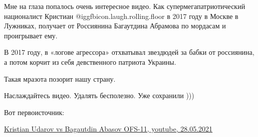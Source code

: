 Мне на глаза попалось очень интересное видео. Как супермегапатриотический
националист Кристиан  @igg{fbicon.laugh.rolling.floor}  в 2017 году в Москве в
Лужниках, получает от Россиянина Багаутдина Абрамова по мордасам и проигрывает
ему.

В 2017 году, в «логове агрессора» отхватывал звездюдей за бабки от россиянина,
а потом корчит из себя девственного патриота Украины. 

Такая мразота позорит нашу страну. 

Наслаждайтесь видео. Удалять бесполезно. Уже сохранили )))

Вот первоисточник: 

\href{https://youtu.be/o2B1e1eZoH0}{%
Kristian Udarov vs Bagautdin Abasov OFS-11, youtube, 28.05.2021%
}
